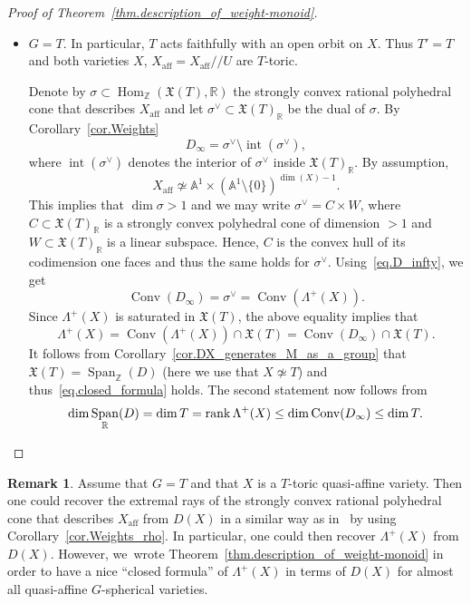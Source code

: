 \documentclass[JEP,XML,SOM,Unicode]{cedram}
\let\oldvee\vee
\renewcommand{\vee}{{\scriptscriptstyle\oldvee}}
\theoremstyle{plain}
\theoremstyle{definition}
\newtheorem{remark}[theorem]{Remark}
\DeclareMathOperator{\Hom}{Hom}
\DeclareMathOperator{\rank}{rank}
\DeclareMathOperator{\aff}{aff}
\DeclareMathOperator{\Conv}{Conv}
\DeclareMathOperator{\Span}{Span}
\DeclareMathOperator{\inter}{int}
\newcommand{\RR}{\mathbb{R}}
\newcommand{\ZZ}{\mathbb{Z}}
\renewcommand{\AA}{\mathbb{A}}
\newcommand{\aquot}{/ \! \! /}
\begin{document}
\begin{proof}[Proof of Theorem~\ref{thm.description_of_weight-monoid}]
\begin{itemize}
\item $G = T$. In particular, $T$ acts faithfully with an open orbit on $X$. Thus
$T' = T$ and both varieties $X$, $X_{\aff} = X_{\aff} \aquot U$ are $T$-toric.

Denote by $\sigma \subset \Hom_{\ZZ}(\mathfrak{X}(T), \RR)$ the strongly convex
rational polyhedral cone that describes $X_{\aff}$ and let
$\sigma^\vee \subset \mathfrak{X}(T)_{\RR}$ be the dual of $\sigma$.
By Corollary~\ref{cor.Weights}
\[
\label{eq.D_infty}
\tag{$\triangle$}
D_{\infty} = \sigma^\vee \setminus \inter(\sigma^\vee),
\]
where $\inter(\sigma^\vee)$ denotes the interior of $\sigma^\vee$ inside $\mathfrak{X}(T)_{\RR}$.
By assumption,
\[
X_{\aff} \not\simeq \AA^1 \times (\AA^1 \setminus \{0\})^{\dim(X)-1}.
\]
This implies that
$\dim \sigma > 1$ and we may write $\sigma^\vee = C \times W$, where
$C \subset \mathfrak{X}(T)_\RR$
is a strongly convex polyhedral cone of dimension $> 1$
and $W \subset \mathfrak{X}(T)_\RR$ is a linear subspace.
Hence, $C$ is the convex hull of its codimension one faces and thus the same holds
for $\sigma^\vee$. Using~\eqref{eq.D_infty}, we get
\[
\Conv(D_{\infty}) = \sigma^\vee = \Conv(\Lambda^+(X)).
\]
Since $\Lambda^+(X)$ is saturated in $\mathfrak{X}(T)$, the above equality implies that
\[
\Lambda^+(X) = \Conv(\Lambda^+(X)) \cap \mathfrak{X}(T) =
\Conv(D_\infty) \cap \mathfrak{X}(T).
\]
It follows from Corollary~\ref{cor.DX_generates_M_as_a_group} that
$\mathfrak{X}(T) = \Span_{\ZZ}(D)$ (here we use that $X \not\simeq T$)
and thus~\eqref{eq.closed_formula} holds. The second statement now follows from
\[
\dim \Span_{\RR}(D) = \dim T = \rank \Lambda^+(X) \leq
\dim \Conv(D_\infty) \leq \dim T.\qedhere
\]
\end{itemize}
\end{proof}

\begin{remark}
Assume that $G = T$ and that $X$ is a $T$-toric quasi-affine variety.
Then one could recover the extremal rays of the strongly convex rational polyhedral
cone that describes $X_{\aff}$ from $D(X)$ in a similar
way as in~\cite[Lem.\,6.11]{LiReUr2018Characterization-o} by using Corollary~\ref{cor.Weights_rho}.
In particular, one could then recover $\Lambda^+(X)$ from $D(X)$.
However, we~wrote Theorem~\ref{thm.description_of_weight-monoid} in order to have a nice
``closed formula''
of $\Lambda^+(X)$ in terms of $D(X)$ for almost all quasi-affine $G$-spherical varieties.
\end{remark}
\end{document}
